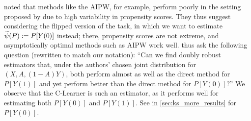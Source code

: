 \citet{robins2007comment} noted that methods like the AIPW, for example, perform poorly in the setting proposed by \citet{KangSc07} 
due to high variability in propensity scores. They thus suggest considering the flipped version of the task, in which we want to estimate $\widetilde{\psi}(P):= P[Y(0)]$ instead; there, propensity scores are not extreme, and asymptotically optimal methods such as AIPW work well. \citet{robins2007comment} thus ask the following question (rewritten to match our notation): ``Can we find doubly robust estimators that, under the authors' chosen joint distribution for $(X,A,(1-A)Y)$, both perform almost as well as the direct method for $P[Y(1)]$ 
and yet perform better than the direct method for $P[Y(0)]$?''
We observe that the C-Learner is such an estimator, as it performs well for estimating both $P[Y(0)]$ and $P[Y(1)]$. See  in \cref{sec:ks_more_results} for 
$P[Y(0)]$. 

\ifdefined\pnas
\else

\fi



